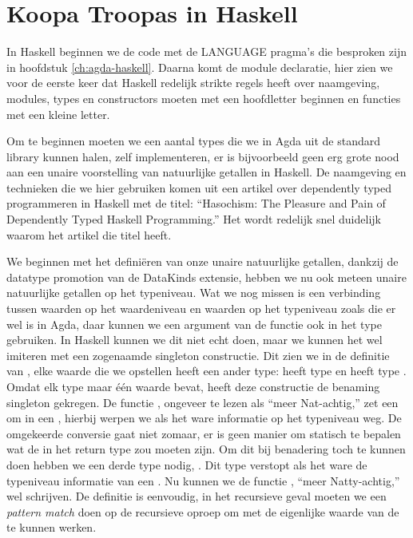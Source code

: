 \section{Koopa Troopas in Haskell}

In Haskell beginnen we de code met de LANGUAGE pragma's die besproken zijn in
hoofdstuk \ref{ch:agda-haskell}. Daarna komt de module declaratie, hier zien we
voor de eerste keer dat Haskell redelijk strikte regels heeft over naamgeving,
modules, types en constructors moeten met een hoofdletter beginnen en functies
met een kleine letter.


Om te beginnen moeten we een aantal types die we in Agda uit de standard
library kunnen halen, zelf implementeren, er is bijvoorbeeld geen erg grote
nood aan een unaire voorstelling van natuurlijke getallen in Haskell. De
naamgeving en technieken die we hier gebruiken komen uit een artikel
\cite{hasochism} over dependently typed programmeren in Haskell met de titel:
``Hasochism: The Pleasure and Pain of Dependently Typed Haskell Programming.''
Het wordt redelijk snel duidelijk waarom het artikel die titel heeft.


We beginnen met het definiëren van onze unaire natuurlijke getallen, dankzij de
datatype promotion van de DataKinds extensie, hebben we nu ook meteen unaire
natuurlijke getallen op het typeniveau. Wat we nog missen is een verbinding
tussen waarden op het waardeniveau en waarden op het typeniveau zoals die er
wel is in Agda, daar kunnen we een argument van de functie ook in het type
gebruiken. In Haskell kunnen we dit niet echt doen, maar we kunnen het wel
imiteren met een zogenaamde singleton constructie. Dit zien we in de definitie
van , elke waarde die we opstellen heeft een ander type:
 heeft type  en  heeft type . Omdat elk type  maar één waarde bevat, heeft deze
constructie de benaming singleton gekregen. De functie , ongeveer
te lezen als ``meer Nat-achtig,'' zet een  om in een ,
hierbij werpen we als het ware informatie op het typeniveau weg. De omgekeerde
conversie gaat niet zomaar, er is geen manier om statisch te bepalen wat de
 in het return type  zou moeten zijn. Om dit bij
benadering toch te kunnen doen hebben we een derde type nodig, .
Dit type verstopt als het ware de typeniveau informatie van een . Nu kunnen we de functie , ``meer Natty-achtig,'' wel
schrijven. De definitie is eenvoudig, in het recursieve geval moeten we een
\emph{pattern match} doen op de recursieve oproep om met de eigenlijke waarde van de
 te kunnen werken.

